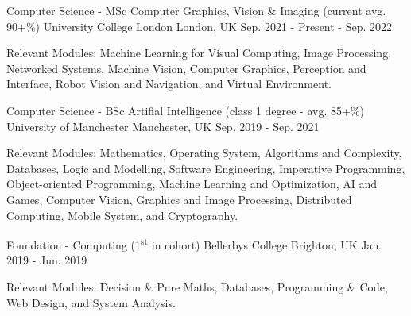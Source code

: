 

\begin{cventries}

  \cventry
    {Computer Science - MSc Computer Graphics, Vision \& Imaging (current avg. 90+\%)} %
    {University College London} %
    {London, UK} %
    {Sep. 2021 - Present - Sep. 2022} %
    {
      \begin{cvitems} %
        \item {Relevant Modules: Machine Learning for Visual Computing, Image Processing, Networked Systems, Machine Vision, Computer Graphics, Perception and Interface, Robot Vision and Navigation, and Virtual Environment.}
      \end{cvitems}
    }
    
  \cventry
    {Computer Science - BSc Artifial Intelligence (class 1 degree - avg. 85+\%)} %
    {University of Manchester} %
    {Manchester, UK} %
    {Sep. 2019 - Sep. 2021} %
    {
      \begin{cvitems} %
        \item {Relevant Modules: Mathematics, Operating System, Algorithms and Complexity, Databases, Logic and Modelling, Software Engineering, Imperative Programming, Object-oriented Programming, Machine Learning and Optimization, AI and Games,  Computer Vision, Graphics and Image Processing, Distributed Computing, Mobile System, and Cryptography.}
      \end{cvitems}
    }
    
    \cventry
    {Foundation - Computing (1\textsuperscript{st} in cohort)} %
    {Bellerbys College} %
    {Brighton, UK} %
    {Jan. 2019 - Jun. 2019} %
    {
     \begin{cvitems} %
        \item {Relevant Modules: Decision \& Pure Maths, Databases, Programming \& Code, Web Design, and System Analysis.}
      \end{cvitems}
    }
    

\end{cventries}
